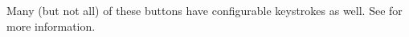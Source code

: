 \documentclass[
 11pt,
 twoside,
 a4paper,
 headinclude,
 footinclude,
 final                                 %
]{article}
\begin{document}
   Many (but not all) of these buttons have configurable keystrokes as well.
   See  for more information.

%


\rhead{\rightmark}         %



































% 







\end{document}
